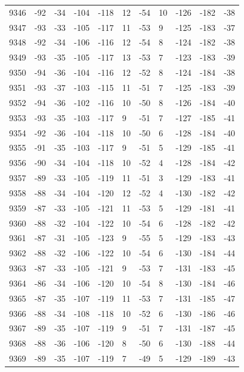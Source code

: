 \begin{table}[H]
\begin{tabular}{lllllllllll}
9346 & -92 & -34 & -104 & -118 & 12 & -54 & 10 & -126 & -182 & -38 \\
9347 & -93 & -33 & -105 & -117 & 11 & -53 & 9 & -125 & -183 & -37 \\
9348 & -92 & -34 & -106 & -116 & 12 & -54 & 8 & -124 & -182 & -38 \\
9349 & -93 & -35 & -105 & -117 & 13 & -53 & 7 & -123 & -183 & -39 \\
9350 & -94 & -36 & -104 & -116 & 12 & -52 & 8 & -124 & -184 & -38 \\
9351 & -93 & -37 & -103 & -115 & 11 & -51 & 7 & -125 & -183 & -39 \\
9352 & -94 & -36 & -102 & -116 & 10 & -50 & 8 & -126 & -184 & -40 \\
9353 & -93 & -35 & -103 & -117 & 9 & -51 & 7 & -127 & -185 & -41 \\
9354 & -92 & -36 & -104 & -118 & 10 & -50 & 6 & -128 & -184 & -40 \\
9355 & -91 & -35 & -103 & -117 & 9 & -51 & 5 & -129 & -185 & -41 \\
9356 & -90 & -34 & -104 & -118 & 10 & -52 & 4 & -128 & -184 & -42 \\
9357 & -89 & -33 & -105 & -119 & 11 & -51 & 3 & -129 & -183 & -41 \\
9358 & -88 & -34 & -104 & -120 & 12 & -52 & 4 & -130 & -182 & -42 \\
9359 & -87 & -33 & -105 & -121 & 11 & -53 & 5 & -129 & -181 & -41 \\
9360 & -88 & -32 & -104 & -122 & 10 & -54 & 6 & -128 & -182 & -42 \\
9361 & -87 & -31 & -105 & -123 & 9 & -55 & 5 & -129 & -183 & -43 \\
9362 & -88 & -32 & -106 & -122 & 10 & -54 & 6 & -130 & -184 & -44 \\
9363 & -87 & -33 & -105 & -121 & 9 & -53 & 7 & -131 & -183 & -45 \\
9364 & -86 & -34 & -106 & -120 & 10 & -54 & 8 & -130 & -184 & -46 \\
9365 & -87 & -35 & -107 & -119 & 11 & -53 & 7 & -131 & -185 & -47 \\
9366 & -88 & -34 & -108 & -118 & 10 & -52 & 6 & -130 & -186 & -46 \\
9367 & -89 & -35 & -107 & -119 & 9 & -51 & 7 & -131 & -187 & -45 \\
9368 & -88 & -36 & -106 & -120 & 8 & -50 & 6 & -130 & -188 & -44 \\
9369 & -89 & -35 & -107 & -119 & 7 & -49 & 5 & -129 & -189 & -43 \\

\end{tabular}
\end{table}
